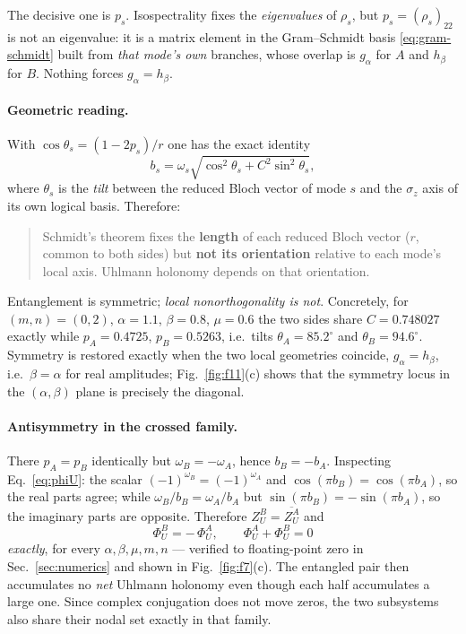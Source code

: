 \documentclass[11pt]{article}
\begin{document}
The decisive one is $p_s$. Isospectrality fixes the \emph{eigenvalues} of
$\rho_s$, but $p_s=(\rho_s)_{22}$ is not an eigenvalue: it is a matrix element
in the Gram--Schmidt basis \eqref{eq:gram-schmidt} built from \emph{that mode's
own} branches, whose overlap is $g_\alpha$ for $A$ and $h_\beta$ for $B$.
Nothing forces $g_\alpha=h_\beta$.

\paragraph{Geometric reading.}
With $\cos\theta_s=(1-2p_s)/r$ one has the exact identity
\begin{equation}
b_s=\omega_s\sqrt{\cos^2\theta_s+C^2\sin^2\theta_s},
\label{eq:b-tilt}
\end{equation}
where $\theta_s$ is the \emph{tilt} between the reduced Bloch vector of mode
$s$ and the $\sigma_z$ axis of its own logical basis. Therefore:

\begin{quote}
Schmidt's theorem fixes the \textbf{length} of each reduced Bloch vector
($r$, common to both sides) but \textbf{not its orientation} relative to each
mode's local axis. Uhlmann holonomy depends on that orientation.
\end{quote}

Entanglement is symmetric; \emph{local nonorthogonality is not}. Concretely,
for $(m,n)=(0,2)$, $\alpha=1.1$, $\beta=0.8$, $\mu=0.6$ the two sides share
$C=0.748027$ exactly while $p_A=0.4725$, $p_B=0.5263$, i.e.\ tilts
$\theta_A=85.2^\circ$ and $\theta_B=94.6^\circ$. Symmetry is restored exactly
when the two local geometries coincide, $g_\alpha=h_\beta$, i.e.\ $\beta=\alpha$
for real amplitudes; Fig.~\ref{fig:f11}(c) shows that the symmetry locus in the
$(\alpha,\beta)$ plane is precisely the diagonal.

\paragraph{Antisymmetry in the crossed family.}
There $p_A=p_B$ identically but $\omega_B=-\omega_A$, hence $b_B=-b_A$.
Inspecting Eq.~\eqref{eq:phiU}: the scalar $(-1)^{\omega_B}=(-1)^{\omega_A}$ and
$\cos(\pi b_B)=\cos(\pi b_A)$, so the real parts agree; while
$\omega_B/b_B=\omega_A/b_A$ but $\sin(\pi b_B)=-\sin(\pi b_A)$, so the
imaginary parts are opposite. Therefore $Z_U^B=\overline{Z_U^A}$ and
\begin{equation}
\boxed{\;\Phi_U^B=-\,\Phi_U^A,\qquad \Phi_U^A+\Phi_U^B=0\;}
\label{eq:antisym}
\end{equation}
\emph{exactly}, for every $\alpha,\beta,\mu,m,n$ --- verified to floating-point
zero in Sec.~\ref{sec:numerics} and shown in Fig.~\ref{fig:f7}(c). The
entangled pair then accumulates no \emph{net} Uhlmann holonomy even though each
half accumulates a large one. Since complex conjugation does not move zeros,
the two subsystems also share their nodal set exactly in that family.
\end{document}
